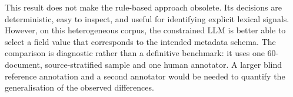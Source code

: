This result does not make the rule-based approach obsolete. Its decisions are
deterministic, easy to inspect, and useful for identifying explicit lexical
signals. However, on this heterogeneous corpus, the constrained LLM is better
able to select a field value that corresponds to the intended metadata schema.
The comparison is diagnostic rather than a definitive benchmark: it uses one
60-document, source-stratified sample and one human annotator. A larger blind
reference annotation and a second annotator would be needed to quantify the
generalisation of the observed differences.
